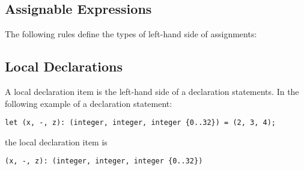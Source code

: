 \subsection{Assignable Expressions \label{sec:AssignableExoressions}}
The following rules define the types of left-hand side of assignments:


\subsection{Local Declarations \label{sec:LocalDeclarations}}


\BackupOriginalAST{
\begin{flalign*}
\localdeclkeyword \derives\ & \LDKVar \;|\; \LDKLet &
\end{flalign*}
}

A local declaration item is the left-hand side of a declaration statements.
In the following example of a declaration statement:
\begin{lstlisting}
let (x, -, z): (integer, integer, integer {0..32}) = (2, 3, 4);
\end{lstlisting}
the local declaration item is
\begin{lstlisting}
(x, -, z): (integer, integer, integer {0..32})
\end{lstlisting}

\BackupOriginalAST{
\begin{flalign*}
\localdeclitem \derives\ &
  & \\
  |\ & \LDIVar(\Identifier)
  & \\
  |\ & \LDITuple(\KleeneStar{\Identifier}) &
\end{flalign*}
}
